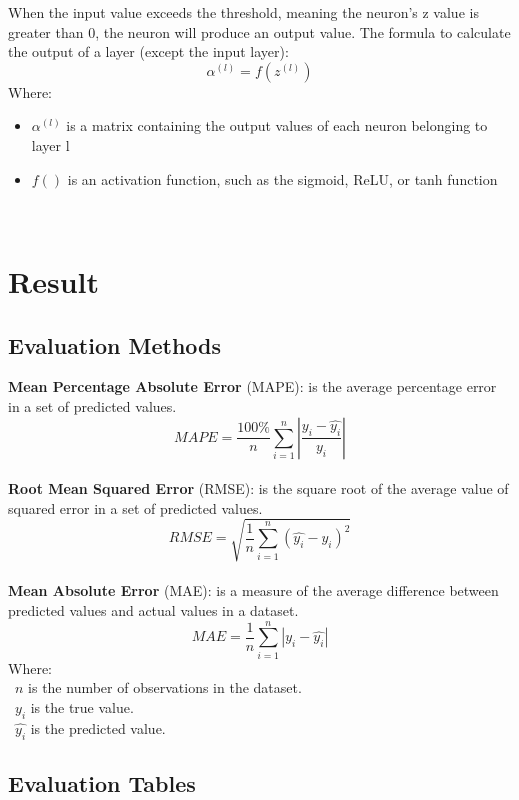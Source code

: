 \documentclass{ieeeojies}
\begin{document}
When the input value exceeds the threshold, meaning the neuron's z value is greater than 0, the neuron will produce an output value. The formula to calculate the output of a layer (except the input layer):
\[ \alpha^{(l)} = f(z^{(l)}) \]
Where:
    \begin{itemize}
        \item $\alpha^{(l)}$ is a matrix containing the output values of each neuron belonging to layer l
        \item  $f()$ is an activation function, such as the sigmoid, ReLU, or tanh function
        \cite{mlp}
    \end{itemize}\\
    
\section{Result}
\subsection{Evaluation Methods}
\textbf{Mean Percentage Absolute Error} (MAPE): is the average percentage error in a set of predicted values.\\
\[MAPE=\frac{100\%}{n}  \sum_{i=1}^{n} |\frac{y_i-\hat{y_i}}{y_i}|\]\\
\textbf{Root Mean Squared Error} (RMSE): is the square root of the average value of squared error in a set of predicted values.\\
\[RMSE=\sqrt{\frac{1}{n} \sum_{i=1}^{n}(\hat{y_i}-y_i )^2}\]\\
\textbf{Mean Absolute Error} (MAE): is a measure of the average difference between predicted values and actual values in a dataset.\\
\[MAE = \frac{1}{n} \sum_{i=1}^{n} |y_i - \hat{y_i}| \]
Where: \\
	\indent\textbullet\ \(n\) is the number of observations in the dataset.\\
	\indent\textbullet\ \(y_i\)  is the true value.\\
	\indent\textbullet\ \(\hat{y_i}\) is the predicted value.
        \cite{sefidian_guide}
        
\subsection{Evaluation Tables} 
\end{document}
